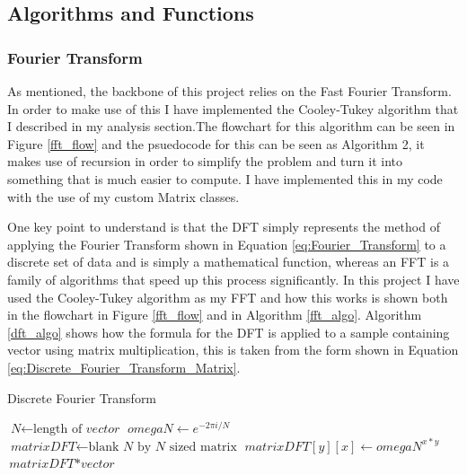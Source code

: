 \documentclass[12pt]{report}
\begin{document}
\subsection*{Algorithms and Functions}

\subsubsection*{Fourier Transform}

As mentioned, the backbone of this project relies on the Fast Fourier Transform. In order to make use of this I have implemented the Cooley-Tukey algorithm that I described in my analysis section.The flowchart for this algorithm can be seen in Figure \ref{fft_flow} and the psuedocode for this can be seen as Algorithm 2, it makes use of recursion in order to simplify the problem and turn it into something that is much easier to compute. I have implemented this in my code with the use of my custom Matrix classes.

One key point to understand is that the DFT simply represents the method of applying the Fourier Transform shown in Equation \ref{eq:Fourier_Transform} to a discrete set of data and is simply a mathematical function, whereas an FFT is a family of algorithms that speed up this process significantly. In this project I have used the Cooley-Tukey algorithm as my FFT and how this works is shown both in the flowchart in Figure \ref{fft_flow} and in Algorithm \ref{fft_algo}. Algorithm \ref{dft_algo} shows how the formula for the DFT is applied to a sample containing vector using matrix multiplication, this is taken from the form shown in Equation \ref{eq:Discrete_Fourier_Transform_Matrix}.

\begin{algorithm}
\caption{Discrete Fourier Transform}\label{dft_algo}
\begin{algorithmic}[1]

\State $\textit{N} \gets \text{length of } \textit{vector}$
\State $\textit{omegaN} \gets e^{-2 \pi i / N}$
\State $\textit{matrixDFT} \gets \text{blank } \textit{N} \text{ by }\textit{N} \text{ sized matrix}$
       \State $\textit{matrixDFT}[y][x] \gets \textit{omegaN}^{x*y}$
   \EndFor
\EndFor
\Return $\textit{matrixDFT} * \textit{vector}$
\EndProcedure 
\end{algorithmic}
\end{algorithm}
\end{document}
